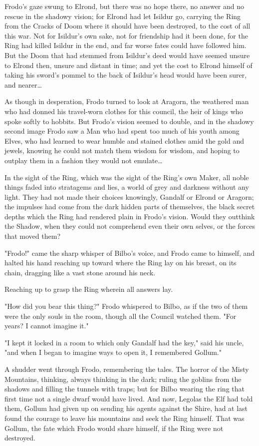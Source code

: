 Frodo's gaze swung to Elrond, but there was no hope there, no answer and no 
rescue in the shadowy vision; for Elrond had let Isildur go, carrying the Ring 
from the Cracks of Doom where it should have been destroyed, to the cost of all 
this war. Not for Isildur's own sake, not for friendship had it been done, for 
the Ring had killed Isildur in the end, and far worse fates could have followed 
him. But the Doom that had stemmed from Isildur's deed would have seemed unsure 
to Elrond then, unsure and distant in time; and yet the cost to Elrond himself 
of taking his sword's pommel to the back of Isildur's head would have been 
surer, and nearer{\ldots}

As though in desperation, Frodo turned to look at Aragorn, the weathered man 
who had donned his travel-worn clothes for this council, the heir of kings who 
spoke softly to hobbits. But Frodo's vision seemed to double, and in the 
shadowy second image Frodo saw a Man who had spent too much of his youth among 
Elves, who had learned to wear humble and stained clothes amid the gold and 
jewels, knowing he could not match them wisdom for wisdom, and hoping to 
outplay them in a fashion they would not emulate{\ldots}

In the sight of the Ring, which was the sight of the Ring's own Maker, all 
noble things faded into stratagems and lies, a world of grey and darkness 
without any light. They had not made their choices knowingly, Gandalf or Elrond 
or Aragorn; the impulses had come from the dark hidden parts of themselves, the 
black secret depths which the Ring had rendered plain in Frodo's vision. Would 
they outthink the Shadow, when they could not comprehend even their own selves, 
or the forces that moved them?

"Frodo!" came the sharp whisper of Bilbo's voice, and Frodo came to himself, 
and halted his hand reaching up toward where the Ring lay on his breast, on its 
chain, dragging like a vast stone around his neck.

Reaching up to grasp the Ring wherein all answers lay.

"How did you bear this thing?" Frodo whispered to Bilbo, as if the two of them 
were the only souls in the room, though all the Council watched them. "For 
years? I cannot imagine it."

"I kept it locked in a room to which only Gandalf had the key," said his uncle, 
"and when I began to imagine ways to open it, I remembered Gollum."

A shudder went through Frodo, remembering the tales. The horror of the Misty 
Mountains, thinking, always thinking in the dark; ruling the goblins from the 
shadows and filling the tunnels with traps; but for Bilbo wearing the ring that 
first time not a single dwarf would have lived. And now, Legolas the Elf had 
told them, Gollum had given up on sending his agents against the Shire, had at 
last found the courage to leave his mountains and seek the Ring himself. That 
was Gollum, the fate which Frodo would share himself, if the Ring were not 
destroyed.

